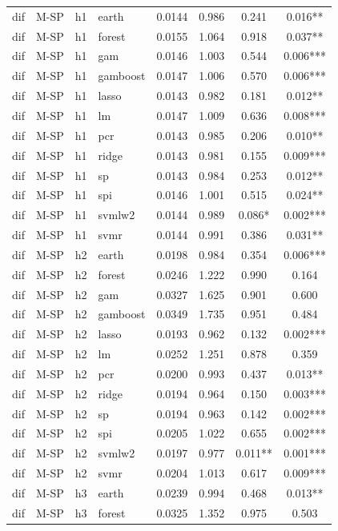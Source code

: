\begin{ThreePartTable}
\begin{longtable}[t]{llclcccc}
\addlinespace
dif & M-SP & h1 & earth & 0.0144 & 0.986 & 0.241 & 0.016**\\
dif & M-SP & h1 & forest & 0.0155 & 1.064 & 0.918 & 0.037**\\
dif & M-SP & h1 & gam & 0.0146 & 1.003 & 0.544 & 0.006***\\
dif & M-SP & h1 & gamboost & 0.0147 & 1.006 & 0.570 & 0.006***\\
dif & M-SP & h1 & lasso & 0.0143 & 0.982 & 0.181 & 0.012**\\
dif & M-SP & h1 & lm & 0.0147 & 1.009 & 0.636 & 0.008***\\
dif & M-SP & h1 & pcr & 0.0143 & 0.985 & 0.206 & 0.010**\\
dif & M-SP & h1 & ridge & 0.0143 & 0.981 & 0.155 & 0.009***\\
dif & M-SP & h1 & sp & 0.0143 & 0.984 & 0.253 & 0.012**\\
dif & M-SP & h1 & spi & 0.0146 & 1.001 & 0.515 & 0.024**\\
dif & M-SP & h1 & svmlw2 & 0.0144 & 0.989 & 0.086* & 0.002***\\
dif & M-SP & h1 & svmr & 0.0144 & 0.991 & 0.386 & 0.031**\\
\addlinespace
dif & M-SP & h2 & earth & 0.0198 & 0.984 & 0.354 & 0.006***\\
dif & M-SP & h2 & forest & 0.0246 & 1.222 & 0.990 & 0.164\\
dif & M-SP & h2 & gam & 0.0327 & 1.625 & 0.901 & 0.600\\
dif & M-SP & h2 & gamboost & 0.0349 & 1.735 & 0.951 & 0.484\\
dif & M-SP & h2 & lasso & 0.0193 & 0.962 & 0.132 & 0.002***\\
dif & M-SP & h2 & lm & 0.0252 & 1.251 & 0.878 & 0.359\\
dif & M-SP & h2 & pcr & 0.0200 & 0.993 & 0.437 & 0.013**\\
dif & M-SP & h2 & ridge & 0.0194 & 0.964 & 0.150 & 0.003***\\
dif & M-SP & h2 & sp & 0.0194 & 0.963 & 0.142 & 0.002***\\
dif & M-SP & h2 & spi & 0.0205 & 1.022 & 0.655 & 0.002***\\
dif & M-SP & h2 & svmlw2 & 0.0197 & 0.977 & 0.011** & 0.001***\\
dif & M-SP & h2 & svmr & 0.0204 & 1.013 & 0.617 & 0.009***\\
\addlinespace
dif & M-SP & h3 & earth & 0.0239 & 0.994 & 0.468 & 0.013**\\
dif & M-SP & h3 & forest & 0.0325 & 1.352 & 0.975 & 0.503\\

\end{longtable}
\end{ThreePartTable}
